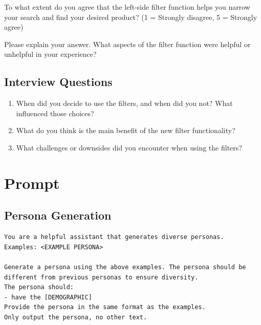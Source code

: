 \documentclass[manuscript,review,anonymous]{acmart}
\begin{document}
To what extent do you agree that the left-side filter function helps you narrow your search and find your desired product? (1 = Strongly disagree, 5 = Strongly agree)

Please explain your answer. What aspects of the filter function were helpful or unhelpful in your experience?

\subsection*{Interview Questions}
\begin{enumerate}
    \item When did you decide to use the filters, and when did you not? What influenced those choices?
    \item What do you think is the main benefit of the new filter functionality?
    \item What challenges or downsides did you encounter when using the filters?
\end{enumerate}


\section{Prompt}
\subsection{Persona Generation}
\label{sec:prompt-persona}
\begin{verbatim}
You are a helpful assistant that generates diverse personas.
Examples: <EXAMPLE PERSONA>

Generate a persona using the above examples. The persona should be different from previous personas to ensure diversity.
The persona should:
- have the [DEMOGRAPHIC]
Provide the persona in the same format as the examples.
Only output the persona, no other text.
\end{verbatim}
\end{document}

